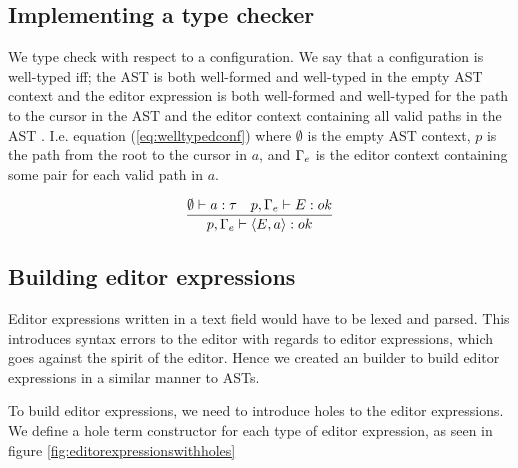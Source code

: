 \subsection{Implementing a type checker}

We type check with respect to a
configuration. We say that a configuration is well-typed iff; the AST is both
well-formed and well-typed in the empty AST context and the editor expression
is both well-formed and well-typed for the path to the cursor in the AST and
the editor context containing all valid paths in the AST \pepm. I.e. equation
(\ref{eq:welltypedconf}) where $\emptyset$ is the empty AST context, $p$ is the
path from the root to the cursor in $a$, and $\Gamma_{e}$ is the editor context
containing some pair for each valid path in $a$.

\begin{equation}\label{eq:welltypedconf}
  \frac{\emptyset \vdash a : \tau \quad p,\Gamma_{e} \vdash E : ok} {p,\Gamma_{e} \vdash \langle E,a \rangle : ok}\\ 
\end{equation}

\subsection{Building editor expressions}
Editor expressions written in a text field would have to be lexed and parsed.
This introduces syntax errors to the editor with regards to editor expressions,
which goes against the spirit of the editor. Hence we created an builder to
build editor expressions in a similar manner to ASTs.

To build editor expressions, we need to introduce holes to the editor
expressions. We define a hole term constructor for each type of editor
expression, as seen in figure \ref{fig:editorexpressionswithholes}

